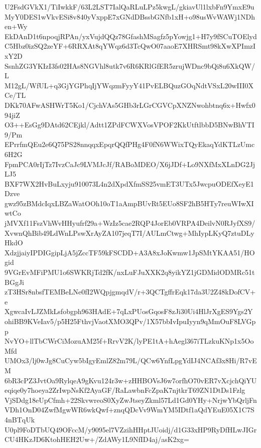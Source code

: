 U2FsdGVkX1/TiIwkkF/63L2LST7IalQaRLuLPz5kwgL/gkiavUl1lxbFn9YmxE9u
MyY0DES1wVkvESi8v840yVxppE7xGNdDBssbGNfb1xH+o98usWvWAWj1NDhen+Wy
EkDAnD1t6npoqjRPAn/yxVujdQQz78GfashMSagfz5pYowjg1+H7y9fSCuTOElyd
C5Hbz0izSQ2zeYF+6RRXAt8qYWqz6d3TcQwO07aaoE7XHRSmt98kXwXPImzIxY2D
SsnhZG3YKIzI3fs02HAs8NGVhl8utk7v6R6KRlGfER5zrujWDnc9bQi8u6XkQW/L
M12gL/WfUL+q3GjYGPhqIjYWqzmFyyY41PvELBQuzGOqNdtVSxL20wIII0XCe/TL
DKk70AFwASHWrT5Ko1/CjchVAs5GHb3rLGrCGVCpXNZNwohbtnq6x+Hwfx094jiZ
O3++EsGg9DAtd62CEjkl/Adtt1ZPdFCWXVosVPOF2KkUtftlbbD5BNwBhVTI9/Pm
EPrrfmQEu2e6Q75PS28nnqqxEpqrQQfPHg4F0fN6WWixTQyEkaqYdKTLzUmc6H2G
FpmPCA0rIjTz7IvzCaJc9LVMJcJf/RABoMDEO/X6jJDf+Lo9NXfMxXLnDG2JjLJ5
BXF7WX2HvBuLxyju910073L4n2dXpdXfmSS25vmET3UTx5JwcpuODEfXeyE1Dzve
gwz95zBMdcIqxLBZaWatOOh10oT1aAmpBUvRt5EUo8SF2hB5HTy7reuWIwXIwtCo
jMVXf11FszVhWvHHyufrf29a+WzIz5cae2RQP4JorEb0VRPA4DeilvN0RJyfXS9/
XvwnQhBib49LdWnLPswXrAyZA107jeqT7I/AULmCtwg+MhIypLKyQ7ztuDLyHkdO
XdzjjaiyIPDIGgipLjA5jZccTF59kFSCDD+A3A8xJoKwmw1JpSMtYKAA51/HOgid
9VGrEvMFiPMU1o6SWKRjTd2fK/nxLuFJuXXK2q8yikYZ1jGDMidODMRc51tBGgJi
zT3HSr8nbsfTEMBeLNe0fI2WQpjgmqdV/r+3QCTgffrEqk17da3U2Z48kDofCV+e
XgwcaIvLJZMkLsfobgph963HAdE+7qLxPUosGqosF8zJi30Ui4HlJrXgES9Ygs2Y
ohiBB9KVeIav5/p5H25FthvjVaotXMO3QPv/1X57bbIvIpuIyyn9qMmOuF8LVGpp
NvYO+llTbCWrCiMozuAM25f+RrvV2K/lyPE1tA+hAegl367iTLzkuKNp1x5OoMfd
UMOx3/lj0wJg8CuCyw5bIgyEmlZ82m79L/QCw6YnfLpgYdIJ4NCAf3x8Hi/R7vEM
6bR3cPZ3JvtOa9RylqeA9gKvu124r3w+zHHBOVsJ6w7orfhO70vER7vXcjchQiYU
eqiqe0y7hoeya2ZrIwpNsKf2AyaGF/RaLawbnFcZpaK7njtkrT69ZN1DtDs1Fzlg
VjSDdg18eUpCfmh+22SkvwreoS0XyZwJtseyZkml57Ld1Gd0YHy+NrjwYbQrljFn
VDh1OnD04ZwfMgwWR6wkQwf+znqQDcVv9WmYM5IDtf1aQdYEuE05X1C7S4nBTqUk
U0pl9FoDTbUQ49OFccM/y9095el7VZzihHHptJUoidj/d1G33xHP9RyDfHLwJIGr
CU4HKzJD6KtohHEH2Uw+/ZdAWy1L9NfID4aj/asK2xg=

